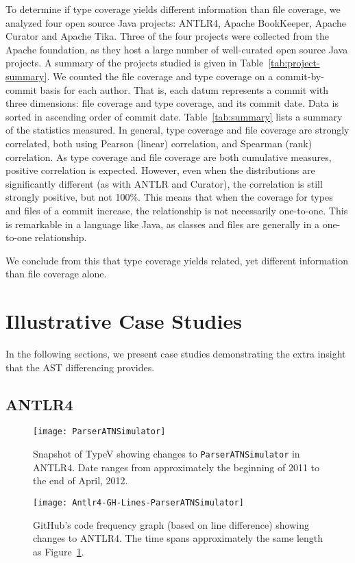 To determine if type coverage yields different information than file coverage, we analyzed four open source Java projects: ANTLR4, Apache BookKeeper, Apache Curator and Apache Tika. Three of the four projects were collected from the Apache foundation, as they host a large number of well-curated open source Java projects. A summary of the projects studied is given in Table~\ref{tab:project-summary}. We counted the file coverage and type coverage on a commit-by-commit basis for each author. That is, each datum represents a commit with three dimensions: file coverage and type coverage, and its commit date. Data is sorted in ascending order of commit date. Table~\ref{tab:summary} lists a summary of the statistics measured. In general, type coverage and file coverage are strongly correlated, both using Pearson (linear) correlation, and Spearman (rank) correlation. As type coverage and file coverage are both cumulative measures, positive correlation is expected. However, even when the distributions are significantly different (as with ANTLR and Curator), the correlation is still strongly positive, but not 100\%. This means that when the coverage for types and files of a commit increase, the relationship is not necessarily one-to-one. This is remarkable in a language like Java, as classes and files are generally in a one-to-one relationship.

We conclude from this that type coverage yields related, yet different information than file coverage alone.

\section{Illustrative Case Studies}

In the following sections, we present case studies demonstrating the extra insight that the AST differencing provides.

\subsection{ANTLR4}

\begin{figure}[!ht]
\centering
\texttt{[image: ParserATNSimulator]}
\caption{Snapshot of TypeV showing changes to \texttt{ParserATNSimulator} in ANTLR4. Date ranges from approximately the beginning of 2011 to the end of April, 2012.}
\label{fig:parser1}
\end{figure}

\begin{figure}[!ht]
\centering
\texttt{[image: Antlr4-GH-Lines-ParserATNSimulator]}
\caption{GitHub's code frequency graph (based on line difference) showing changes to ANTLR4. The time spans approximately the same length as Figure~\ref{fig:parser1}.}
\label{fig:parser2}
\end{figure}

